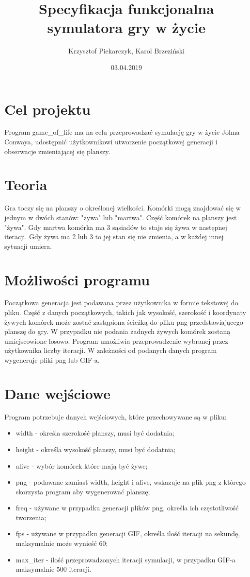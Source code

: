 \documentclass[12pt]{article}
\title{Specyfikacja funkcjonalna symulatora gry w życie}
\author{Krzysztof Piekarczyk, Karol Brzeziński}
\date{03.04.2019}
\begin{document}
\maketitle


\section{Cel projektu}

Program game\_of\_life ma na celu przeprowadzać symulację gry w życie Johna Conwaya, udostępnić użytkownikowi utworzenie początkowej generacji i obserwacje zmieniającej się planszy.

\section{Teoria}

Gra toczy się na planszy o określonej wielkości. Komórki mogą znajdować się w jednym w dwóch stanów: "żywa" lub "martwa". Część komórek na planszy jest "żywa". Gdy martwa komórka ma 3 sąsiadów to staje się żywa w następnej iteracji. Gdy żywa ma 2 lub 3 to jej stan się nie zmienia, a w każdej innej sytuacji umiera.

\section{Możliwości programu}
Początkowa generacja jest podawana przez użytkownika w formie tekstowej do pliku. Część z danych początkowych, takich jak wysokość, szerokość i koordynaty żywych komórek może zostać zastąpiona ścieżką do pliku png przedstawiającego planszę do gry. W przypadku nie podania żadnych żywych komórek zostaną umiejscowione losowo. Program umożliwia przeprowadzenie wybranej przez użytkownika liczby iteracji. W zależności od podanych danych program wygeneruje pliki png lub GIF-a.

\section{Dane wejściowe}

Program potrzebuje danych wejściowych, które przechowywane są w pliku:
\begin{itemize}
	\item width - określa szerokość planszy, musi być dodatnia;
	\item height - określa wysokość planszy, musi być dodatnia;
	\item alive - wybór komórek które mają być żywe;
	\item png - podawane zamiast width, height i alive, wskazuje na plik png z którego skorzysta program aby wygenerować planszę;
	\item freq - używane w przypadku generacji plików png, określa ich częstotliwość tworzenia;
	\item fps - używane w przypadku generacji GIF, określa ilość iteracji na sekundę, maksymalnie może wynieść 60;
	\item max\_iter - ilość przeprowadzonych iteracji symulacji, w przypadku GIF-a maksymalnie 500 iteracji.
\end{itemize}
\end{document}
